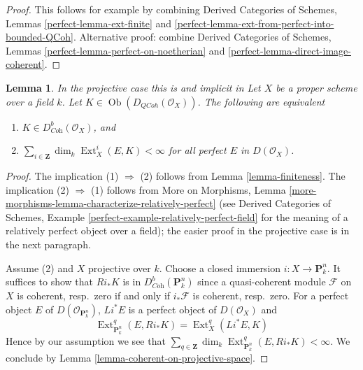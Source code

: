 \documentclass{stacks-project}
\newenvironment{reference}{\comment}{\endcomment}
\theoremstyle{plain}
\newtheorem{lemma}[subsection]{Lemma}
\theoremstyle{definition}
\theoremstyle{remark}
\numberwithin{equation}{subsection}
\def\Ext{\mathop{\mathrm{Ext}}\nolimits}
\def\Ob{\mathop{\mathrm{Ob}}\nolimits}
\def\QCoh{\mathit{QCoh}}
\begin{document}
\begin{proof}
This follows for example by combining
Derived Categories of Schemes, Lemmas \ref{perfect-lemma-ext-finite} and
\ref{perfect-lemma-ext-from-perfect-into-bounded-QCoh}.
Alternative proof: combine
Derived Categories of Schemes, Lemmas
\ref{perfect-lemma-perfect-on-noetherian} and
\ref{perfect-lemma-direct-image-coherent}.
\end{proof}

\begin{lemma}
\label{lemma-characterize-dbcoh-projective}
\begin{reference}
In the projective case this is \cite[Lemma 7.46]{Rouquier-dimensions}
and implicit in \cite[Theorem A.1]{BvdB}
\end{reference}
Let $X$ be a proper scheme over a field $k$. Let
$K \in \Ob(D_\QCoh(\mathcal{O}_X))$. The following are equivalent
\begin{enumerate}
\item $K \in D^b_{\textit{Coh}}(\mathcal{O}_X)$, and
\item $\sum_{i \in \mathbf{Z}} \dim_k \Ext^i_X(E, K) < \infty$
for all perfect $E$ in $D(\mathcal{O}_X)$.
\end{enumerate}
\end{lemma}

\begin{proof}
The implication (1) $\Rightarrow$ (2) follows from
Lemma \ref{lemma-finiteness}.
The implication (2) $\Rightarrow$ (1) follows from
More on Morphisms, Lemma
\ref{more-morphisms-lemma-characterize-relatively-perfect}
(see Derived Categories of Schemes, Example
\ref{perfect-example-relatively-perfect-field}
for the meaning of a relatively perfect object over a field);
the easier proof in the projective case is in the next paragraph.

\medskip\noindent
Assume (2) and $X$ projective over $k$.
Choose a closed immersion $i : X \to \mathbf{P}^n_k$. It suffices to show
that $Ri_*K$ is in $D^b_{\textit{Coh}}(\mathbf{P}^n_k)$ since a quasi-coherent
module $\mathcal{F}$ on $X$ is coherent, resp.\ zero if and only if
$i_*\mathcal{F}$ is coherent, resp.\ zero. For a perfect object $E$
of $D(\mathcal{O}_{\mathbf{P}^n_k})$, $Li^*E$ is a perfect object of
$D(\mathcal{O}_X)$ and
$$
\Ext^q_{\mathbf{P}^n_k}(E, Ri_*K) = \Ext^q_X(Li^*E, K)
$$
Hence by our assumption we see that
$\sum_{q \in \mathbf{Z}} \dim_k \Ext^q_{\mathbf{P}^n_k}(E, Ri_*K) < \infty$.
We conclude by Lemma \ref{lemma-coherent-on-projective-space}.
\end{proof}
\end{document}
